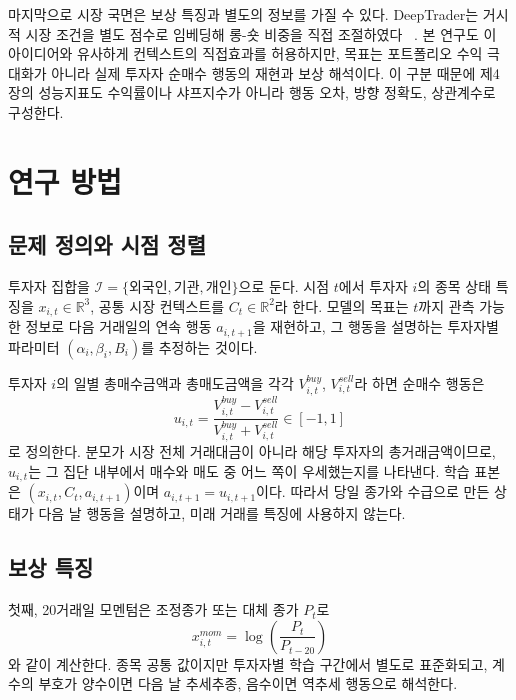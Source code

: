\documentclass[sigconf,nonacm]{acmart}
\begin{document}
마지막으로 시장 국면은 보상 특징과 별도의 정보를 가질 수 있다. DeepTrader는
거시적 시장 조건을 별도 점수로 임베딩해 롱-숏 비중을 직접 조절하였다
~\cite{wang2021deeptrader}. 본 연구도 이 아이디어와 유사하게 컨텍스트의 직접효과를
허용하지만, 목표는 포트폴리오 수익 극대화가 아니라 실제 투자자 순매수 행동의
재현과 보상 해석이다. 이 구분 때문에 제4장의 성능지표도 수익률이나 샤프지수가
아니라 행동 오차, 방향 정확도, 상관계수로 구성한다.

\section{연구 방법}

\subsection{문제 정의와 시점 정렬}

투자자 집합을 $\mathcal{I}=\{\text{외국인},\text{기관},\text{개인}\}$으로 둔다.
시점 $t$에서 투자자 $i$의 종목 상태 특징을 $x_{i,t}\in\mathbb{R}^{3}$, 공통 시장
컨텍스트를 $C_t\in\mathbb{R}^{2}$라 한다. 모델의 목표는 $t$까지 관측 가능한
정보로 다음 거래일의 연속 행동 $a_{i,t+1}$을 재현하고, 그 행동을 설명하는
투자자별 파라미터 $(\alpha_i,\beta_i,B_i)$를 추정하는 것이다.

투자자 $i$의 일별 총매수금액과 총매도금액을 각각 $V^{buy}_{i,t}$,
$V^{sell}_{i,t}$라 하면 순매수 행동은
\begin{equation}
u_{i,t}=\frac{V^{buy}_{i,t}-V^{sell}_{i,t}}
{V^{buy}_{i,t}+V^{sell}_{i,t}}\in[-1,1]
\label{eq:action}
\end{equation}
로 정의한다. 분모가 시장 전체 거래대금이 아니라 해당 투자자의 총거래금액이므로,
$u_{i,t}$는 그 집단 내부에서 매수와 매도 중 어느 쪽이 우세했는지를 나타낸다.
학습 표본은 $(x_{i,t},C_t,a_{i,t+1})$이며 $a_{i,t+1}=u_{i,t+1}$이다. 따라서
당일 종가와 수급으로 만든 상태가 다음 날 행동을 설명하고, 미래 거래를 특징에
사용하지 않는다.

\subsection{보상 특징}

첫째, 20거래일 모멘텀은 조정종가 또는 대체 종가 $P_t$로
\begin{equation}
x^{mom}_{i,t}=\log\left(\frac{P_t}{P_{t-20}}\right)
\label{eq:momentum}
\end{equation}
와 같이 계산한다. 종목 공통 값이지만 투자자별 학습 구간에서 별도로 표준화되고,
계수의 부호가 양수이면 다음 날 추세추종, 음수이면 역추세 행동으로 해석한다.
\end{document}
